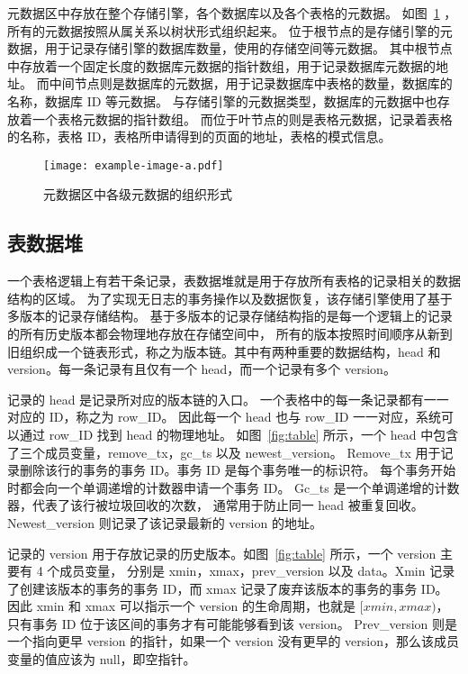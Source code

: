 元数据区中存放在整个存储引擎，各个数据库以及各个表格的元数据。
如图~\ref{fig:catalog} ，所有的元数据按照从属关系以树状形式组织起来。
位于根节点的是存储引擎的元数据，用于记录存储引擎的数据库数量，使用的存储空间等元数据。
其中根节点中存放着一个固定长度的数据库元数据的指针数组，用于记录数据库元数据的地址。
而中间节点则是数据库的元数据，用于记录数据库中表格的数量，数据库的名称，数据库 ID 等元数据。
与存储引擎的元数据类型，数据库的元数据中也存放着一个表格元数据的指针数组。
而位于叶节点的则是表格元数据，记录着表格的名称，表格 ID，表格所申请得到的页面的地址，表格的模式信息。


\begin{figure}
    \centering
    \texttt{[image: example-image-a.pdf]}
    \caption{元数据区中各级元数据的组织形式}
    \label{fig:catalog}
\end{figure}


\subsection{表数据堆}
\label{ssec:table_heap}


一个表格逻辑上有若干条记录，表数据堆就是用于存放所有表格的记录相关的数据结构的区域。
为了实现无日志的事务操作以及数据恢复，该存储引擎使用了基于多版本的记录存储结构。
基于多版本的记录存储结构指的是每一个逻辑上的记录的所有历史版本都会物理地存放在存储空间中，
所有的版本按照时间顺序从新到旧组织成一个链表形式，称之为版本链。其中有两种重要的数据结构，head 和
version。每一条记录有且仅有一个 head，而一个记录有多个 version。

记录的 head 是记录所对应的版本链的入口。
一个表格中的每一条记录都有一一对应的 ID，称之为 row\_ID。
因此每一个 head 也与 row\_ID 一一对应，系统可以通过 row\_ID 找到 head 的物理地址。
如图~\ref{fig:table} 所示，一个 head 中包含了三个成员变量，remove\_tx，gc\_ts 以及 newest\_version。
Remove\_tx 用于记录删除该行的事务的事务 ID。事务 ID 是每个事务唯一的标识符。
每个事务开始时都会向一个单调递增的计数器申请一个事务 ID。
Gc\_ts 是一个单调递增的计数器，代表了该行被垃圾回收的次数，
通常用于防止同一 head 被重复回收。Newest\_version 则记录了该记录最新的 version 的地址。

记录的 version 用于存放记录的历史版本。如图~\ref{fig:table} 所示，一个 version 主要有 4 个成员变量，
分别是 xmin，xmax，prev\_version 以及 data。Xmin 记录了创建该版本的事务的事务 ID，而 xmax 记录了废弃该版本的事务的事务 ID。
因此 xmin 和 xmax 可以指示一个 version 的生命周期，也就是 $[xmin, xmax)$，只有事务 ID 位于该区间的事务才有可能能够看到该 version。
Prev\_version 则是一个指向更早 version 的指针，如果一个 version 没有更早的 version，那么该成员变量的值应该为 null，即空指针。

